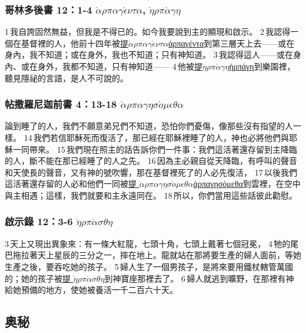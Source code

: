 \subsubsection{哥林多後書 12：1-4 $\grave{\alpha}$$\rho$$\pi$$\alpha$$\gamma$$\acute{\epsilon}$$\nu$$\tau$$\alpha$, $\grave{\eta}$$\rho$$\pi$$\acute{\alpha}$$\gamma$$\eta$}
1 我自誇固然無益，但我是不得已的。如今我要說到主的顯現和啟示。 2 我認得一個在基督裡的人，他前十四年被\underline{提$\grave{\alpha}$$\rho$$\pi$$\alpha$$\gamma$$\acute{\epsilon}$$\nu$$\tau$$\alpha$ἁρπαγέντα}到第三層天上去——或在身內，我不知道；或在身外，我也不知道；只有神知道。 3 我認得這人——或在身內、或在身外，我都不知道，只有神知道—— 4 他被\underline{提$\grave{\eta}$$\rho$$\pi$$\acute{\alpha}$$\gamma$$\eta$ἡρπάγη}到樂園裡，聽見隱祕的言語，是人不可說的。

\subsubsection{帖撒羅尼迦前書 4：13-18 $\grave{\alpha}$$\rho$$\pi$$\alpha$$\gamma$$\eta$$\sigma$$\acute{o}$$\mu$$\epsilon$$\theta$$\alpha$}
論到睡了的人，我們不願意弟兄們不知道，恐怕你們憂傷，像那些沒有指望的人一樣。 14 我們若信耶穌死而復活了，那已經在耶穌裡睡了的人，神也必將他們與耶穌一同帶來。 15 我們現在照主的話告訴你們一件事：我們這活著還存留到主降臨的人，斷不能在那已經睡了的人之先。 16 因為主必親自從天降臨，有呼叫的聲音和天使長的聲音，又有神的號吹響，那在基督裡死了的人必先復活， 17 以後我們這活著還存留的人必和他們一同被\underline{提 $\grave{\alpha}$$\rho$$\pi$$\alpha$$\gamma$$\eta$$\sigma$$\acute{o}$$\mu$$\epsilon$$\theta$$\alpha$ἁρπαγησόμεθα}到雲裡，在空中與主相遇；這樣，我們就要和主永遠同在。 18 所以，你們當用這些話彼此勸慰。

\subsubsection{啟示錄 12：3-6 $\grave{\eta}$$\rho$$\pi$$\acute{\alpha}$$\sigma$$\theta$$\eta$}
3 天上又現出異象來：有一條大紅龍，七頭十角，七頭上戴著七個冠冕， 4 牠的尾巴拖拉著天上星辰的三分之一，摔在地上。龍就站在那將要生產的婦人面前，等她生產之後，要吞吃她的孩子。 5 婦人生了一個男孩子，是將來要用鐵杖轄管萬國的；她的孩子被\underline{提 $\grave{\eta}$$\rho$$\pi$$\acute{\alpha}$$\sigma$$\theta$$\eta$}到神寶座那裡去了。 6 婦人就逃到曠野，在那裡有神給她預備的地方，使她被養活一千二百六十天。

\subsection{奥秘}
